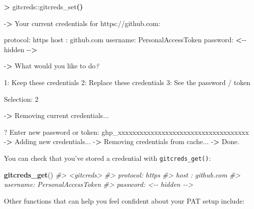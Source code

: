 \documentclass[
]{book}
\newenvironment{Shaded}{\begin{snugshade}}{\end{snugshade}}
\newcommand{\AttributeTok}[1]{\textcolor[rgb]{0.13,0.29,0.53}{#1}}
\newcommand{\CommentTok}[1]{\textcolor[rgb]{0.56,0.35,0.01}{\textit{#1}}}
\newcommand{\ExtensionTok}[1]{#1}
\newcommand{\FunctionTok}[1]{\textcolor[rgb]{0.13,0.29,0.53}{\textbf{#1}}}
\newcommand{\KeywordTok}[1]{\textcolor[rgb]{0.13,0.29,0.53}{\textbf{#1}}}
\newcommand{\NormalTok}[1]{#1}
\newcommand{\OperatorTok}[1]{\textcolor[rgb]{0.81,0.36,0.00}{\textbf{#1}}}
\newcommand{\PreprocessorTok}[1]{\textcolor[rgb]{0.56,0.35,0.01}{\textit{#1}}}
\newcommand{\StringTok}[1]{\textcolor[rgb]{0.31,0.60,0.02}{#1}}
\begin{document}
\begin{Shaded}
\begin{Highlighting}[]
\OperatorTok{\textgreater{}}\NormalTok{ gitcreds::gitcreds\_set}\KeywordTok{()}

\ExtensionTok{{-}}\OperatorTok{\textgreater{}}\NormalTok{ Your current credentials for }\StringTok{\textquotesingle{}https://github.com\textquotesingle{}}\NormalTok{:}

  \ExtensionTok{protocol:}\NormalTok{ https}
  \ExtensionTok{host}\NormalTok{    : github.com}
  \ExtensionTok{username:}\NormalTok{ PersonalAccessToken}
  \ExtensionTok{password:} \OperatorTok{\textless{}}\NormalTok{{-}{-} hidden }\AttributeTok{{-}{-}}\OperatorTok{\textgreater{}}

\ExtensionTok{{-}}\OperatorTok{\textgreater{}}\NormalTok{ What would you like to do}\PreprocessorTok{?} 

\ExtensionTok{1:}\NormalTok{ Keep these credentials}
\ExtensionTok{2:}\NormalTok{ Replace these credentials}
\ExtensionTok{3:}\NormalTok{ See the password / token}

\ExtensionTok{Selection:}\NormalTok{ 2}

\ExtensionTok{{-}}\OperatorTok{\textgreater{}}\NormalTok{ Removing current credentials...}

\ExtensionTok{?}\NormalTok{ Enter new password or token: ghp\_xxxxxxxxxxxxxxxxxxxxxxxxxxxxxxxxxxxx}
\ExtensionTok{{-}}\OperatorTok{\textgreater{}}\NormalTok{ Adding new credentials...}
\ExtensionTok{{-}}\OperatorTok{\textgreater{}}\NormalTok{ Removing credentials from cache...}
\ExtensionTok{{-}}\OperatorTok{\textgreater{}}\NormalTok{ Done.}
\end{Highlighting}
\end{Shaded}

You can check that you've stored a credential with \texttt{gitcreds\_get()}:

\begin{Shaded}
\begin{Highlighting}[]
\FunctionTok{gitcreds\_get}\NormalTok{()}
\CommentTok{\#\textgreater{} \textless{}gitcreds\textgreater{}}
\CommentTok{\#\textgreater{}   protocol: https}
\CommentTok{\#\textgreater{}   host    : github.com}
\CommentTok{\#\textgreater{}   username: PersonalAccessToken}
\CommentTok{\#\textgreater{}   password: \textless{}{-}{-} hidden {-}{-}\textgreater{}}
\end{Highlighting}
\end{Shaded}

Other functions that can help you feel confident about your PAT setup include:
\end{document}
